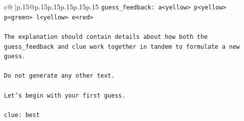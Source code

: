 \documentclass{article}
\begin{document}
{\begin{supertabular}{c@{$\;$}|p{.15\linewidth}@{}p{.15\linewidth}p{.15\linewidth}p{.15\linewidth}p{.15\linewidth}p{.15\linewidth}}
{{{\texttt{guess\_feedback: a<yellow> p<yellow> p<green> l<yellow> e<red>} \\
\\ 
\texttt{The explanation should contain details about how both the guess\_feedback and clue work together in tandem to formulate a new guess.} \\
\\ 
\texttt{Do not generate any other text.} \\
\\ 
\texttt{Let's begin with your first guess.} \\
\\ 
\texttt{clue: best} \\
            }
        }
    }
     \\ \\


\end{supertabular}}
\end{document}
